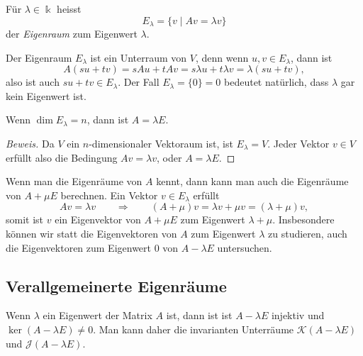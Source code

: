\begin{definition}
Für $\lambda\in\Bbbk$ heisst
\[
E_\lambda
=
\{ v\;|\; Av=\lambda v\}
\]
der {\em Eigenraum} zum Eigenwert $\lambda$.
%
\end{definition}

Der Eigenraum $E_\lambda$ ist ein Unterraum von $V$, denn wenn
$u,v\in E_\lambda$, dann ist
\[
A(su+tv)
=
sAu+tAv
=
s\lambda u + t\lambda v
=
\lambda(su+tv),
\]
also ist auch $su+tv\in E_\lambda$.
Der Fall $E_\lambda = \{0\}=0$ bedeutet natürlich, dass $\lambda$ gar kein
Eigenwert ist.

\begin{satz}
Wenn $\dim E_\lambda=n$, dann ist $A=\lambda E$.
\end{satz}

\begin{proof}[Beweis]
Da $V$ ein $n$-dimensionaler Vektoraum ist, ist $E_\lambda=V$.
Jeder Vektor $v\in V$ erfüllt also die Bedingung $Av=\lambda v$,
oder $A=\lambda E$.
\end{proof}

Wenn man die Eigenräume von $A$ kennt, dann kann man auch die Eigenräume
von $A+\mu E$ berechnen.
Ein Vektor $v\in E_\lambda$ erfüllt
\[
Av=\lambda v
\qquad\Rightarrow\qquad
(A+\mu)v = \lambda v + \mu v
=
(\lambda+\mu)v,
\]
somit ist $v$ ein Eigenvektor von $A+\mu E$ zum Eigenwert $\lambda+\mu$.
Insbesondere können wir statt die Eigenvektoren von $A$ zum Eigenwert $\lambda$
zu studieren, auch die Eigenvektoren zum Eigenwert $0$ von $A-\lambda E$
untersuchen.

%
%
\subsection{Verallgemeinerte Eigenräume
\label{buch:subsection:verallgemeinerte-eigenraeume}}
Wenn $\lambda$ ein Eigenwert der Matrix $A$ ist, dann ist
ist $A-\lambda E$ injektiv und $\ker(A-\lambda E)\ne 0$.
Man kann daher die invarianten Unterräume $\mathcal{K}(A-\lambda E)$
und $\mathcal{J}(A-\lambda E)$.

